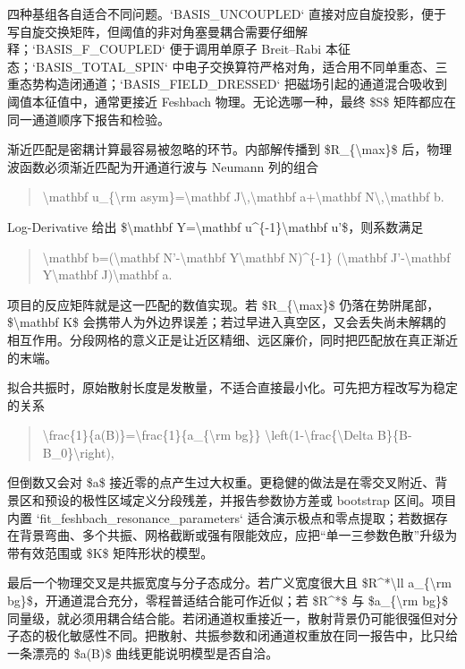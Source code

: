 \documentclass[UTF8,openany,11pt,fontset=fandol]{ctexbook}
\begin{document}
四种基组各自适合不同问题。`BASIS\_UNCOUPLED`
直接对应自旋投影，便于写自旋交换矩阵，但阈值的非对角塞曼耦合需要仔细解释；`BASIS\_F\_COUPLED`
便于调用单原子 Breit--Rabi 本征态；`BASIS\_TOTAL\_SPIN`
中电子交换算符严格对角，适合用不同单重态、三重态势构造闭通道；`BASIS\_FIELD\_DRESSED`
把磁场引起的通道混合吸收到阈值本征值中，通常更接近 Feshbach
物理。无论选哪一种，最终 \$S\$ 矩阵都应在同一通道顺序下报告和检验。

渐近匹配是密耦计算最容易被忽略的环节。内部解传播到
\$R\_\{\textbackslash max\}\$ 后，物理波函数必须渐近匹配为开通道行波与
Neumann 列的组合

\begin{quote}
\textbackslash mathbf u\_\{\textbackslash rm
asym\}=\textbackslash mathbf J\textbackslash,\textbackslash mathbf
a+\textbackslash mathbf N\textbackslash,\textbackslash mathbf b.
\end{quote}

Log-Derivative 给出 \$\textbackslash mathbf Y=\textbackslash mathbf
u\^{}\{-1\}\textbackslash mathbf u'\$，则系数满足

\begin{quote}
\textbackslash mathbf b=(\textbackslash mathbf N'-\textbackslash mathbf
Y\textbackslash mathbf N)\^{}\{-1\} (\textbackslash mathbf
J'-\textbackslash mathbf Y\textbackslash mathbf J)\textbackslash mathbf
a.
\end{quote}

项目的反应矩阵就是这一匹配的数值实现。若 \$R\_\{\textbackslash max\}\$
仍落在势阱尾部，\$\textbackslash mathbf K\$
会携带人为外边界误差；若过早进入真空区，又会丢失尚未解耦的相互作用。分段网格的意义正是让近区精细、远区廉价，同时把匹配放在真正渐近的末端。

拟合共振时，原始散射长度是发散量，不适合直接最小化。可先把方程改写为稳定的关系

\begin{quote}
\textbackslash frac\{1\}\{a(B)\}=\textbackslash frac\{1\}\{a\_\{\textbackslash rm
bg\}\} \textbackslash left(1-\textbackslash frac\{\textbackslash Delta
B\}\{B-B\_0\}\textbackslash right),
\end{quote}

但倒数又会对 \$a\$
接近零的点产生过大权重。更稳健的做法是在零交叉附近、背景区和预设的极性区域定义分段残差，并报告参数协方差或
bootstrap 区间。项目内置 `fit\_feshbach\_resonance\_parameters`
适合演示极点和零点提取；若数据存在背景弯曲、多个共振、网格截断或强有限能效应，应把``单一三参数色散''升级为带有效范围或
\$K\$ 矩阵形状的模型。

最后一个物理交叉是共振宽度与分子态成分。若广义宽度很大且
\$R\^{}*\textbackslash ll \textbar a\_\{\textbackslash rm
bg\}\textbar\$，开通道混合充分，零程普适结合能可作近似；若 \$R\^{}*\$ 与
\$\textbar a\_\{\textbackslash rm bg\}\textbar\$
同量级，就必须用耦合结合能。若闭通道权重接近一，散射背景仍可能很强但对分子态的极化敏感性不同。把散射、共振参数和闭通道权重放在同一报告中，比只给一条漂亮的
\$a(B)\$ 曲线更能说明模型是否自洽。
\end{document}
